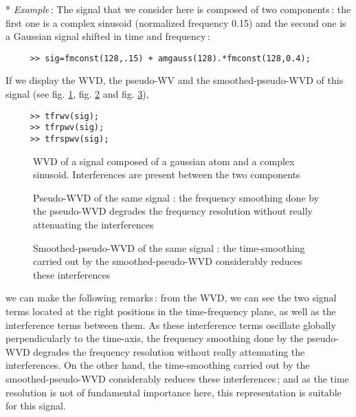   * {\it Example}\,: The signal that we consider here is composed of two
components\,: the first one is a complex sinusoid (normalized frequency
0.15) and the second one is a Gaussian signal shifted in time and
frequency\,:  
\begin{verbatim}
     >> sig=fmconst(128,.15) + amgauss(128).*fmconst(128,0.4);
\end{verbatim}
If we display the WVD, the pseudo-WV and the smoothed-pseudo-WVD of this signal (see
fig. \ref{En1fig8}, fig. \ref{En1fig9} and fig. \ref{En1fig10}),
\begin{verbatim}
     >> tfrwv(sig);  
     >> tfrpwv(sig); 
     >> tfrspwv(sig);
\end{verbatim}
\begin{figure}[htb]
\epsfxsize=10cm
\epsfysize=8cm
\centerline{}
\caption{\label{En1fig8}WVD of a signal composed of a gaussian atom and a
complex sinusoid. Interferences are present between the two components}
\end{figure}
\begin{figure}[htb]
\epsfxsize=10cm
\epsfysize=8cm
\centerline{}
\caption{\label{En1fig9}Pseudo-WVD of the same signal : the frequency
smoothing done by the pseudo-WVD degrades the frequency resolution without
really attenuating the interferences}
\end{figure}
\begin{figure}[htb]
\epsfxsize=10cm
\epsfysize=8cm
\centerline{}
\caption{\label{En1fig10}Smoothed-pseudo-WVD of the same signal : the
time-smoothing carried out by the smoothed-pseudo-WVD considerably reduces
these interferences}
\end{figure}
we can make the following remarks\,: from the WVD, we can see the two signal
terms located at the right positions in the time-frequency plane, as well
as the interference terms between them. As these interference terms
oscillate globally perpendicularly to the time-axis, the frequency
smoothing done by the pseudo-WVD degrades the frequency resolution without
really attenuating the interferences. On the other hand, the time-smoothing
carried out by the smoothed-pseudo-WVD considerably reduces these
interferences\,; and as the time resolution is not of fundamental importance
here, this representation is suitable for this signal.

